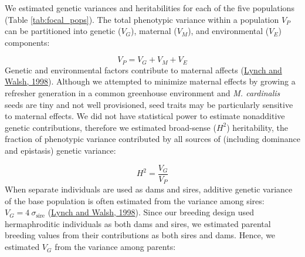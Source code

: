 \documentclass[
  12pt,
]{article}
\begin{document}
We estimated genetic variances and heritabilities for each of the five populations (Table \ref{tab:focal_pops}). The total phenotypic variance within a population \(V_P\) can be partitioned into genetic (\(V_G\)), maternal (\(V_M\)), and environmental (\(V_E\)) components:

\[V_P = V_G + V_M + V_E\]
Genetic and environmental factors contribute to maternal affects (\protect\hyperlink{ref-lynch_genetics_1998}{Lynch and Walsh, 1998}). Although we attempted to minimize maternal effects by growing a refresher generation in a common greenhouse environment and \emph{M. cardinalis} seeds are tiny and not well provisioned, seed traits may be particularly sensitive to maternal effects. We did not have statistical power to estimate nonadditive genetic contributions, therefore we estimated broad-sense (\(H^2\)) heritability, the fraction of phenotypic variance contributed by all sources of (including dominance and epistasis) genetic variance:

\[H ^ 2 = \frac{V_G}{V_P}\]
When separate individuals are used as dams and sires, additive genetic variance of the base population is often estimated from the variance among sires: \(V_G = 4~\sigma_{\mathrm{sire}}\) (\protect\hyperlink{ref-lynch_genetics_1998}{Lynch and Walsh, 1998}). Since our breeding design used hermaphroditic individuals as both dams and sires, we estimated parental breeding values from their contributions as both sires and dams. Hence, we estimated \(V_G\) from the variance among parents:
\end{document}
